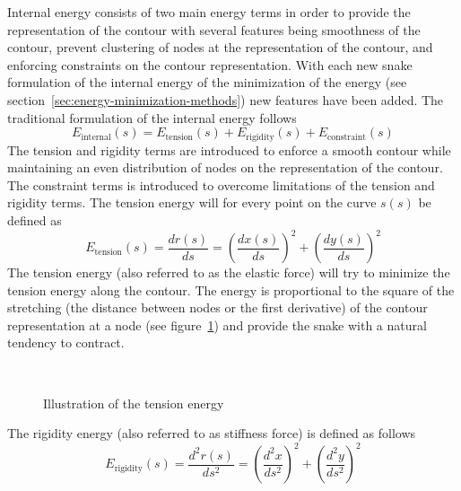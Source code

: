 Internal energy consists of two main energy terms in order to provide
the representation of the contour with several features being
smoothness of the contour, prevent clustering of nodes at the
representation of the contour, and enforcing constraints on the
contour representation. With each new snake formulation of the
internal energy of the minimization of the energy (see
section~\ref{sec:energy-minimization-methods}) new features have been
added. The traditional formulation of the internal energy follows
\begin{equation}
  \label{eq:snake-energy-internal}
  E_{\text{internal}}(s) = 
    E_{\text{tension}}(s) + 
    E_{\text{rigidity}}(s) +
    E_{\text{constraint}}(s)
\end{equation}
The tension and rigidity terms are introduced to enforce a smooth
contour while maintaining an even distribution of nodes on the
representation of the contour. The constraint terms is introduced to
overcome limitations of the tension and rigidity terms.  The tension
energy will for every point on the curve $s(s)$ be defined as
\begin{equation}
  \label{eq:energy-elastic}
  E_{\text{tension}}(s) = \frac{dr(s)}{ds} = \left(\frac{dx(s)}{ds}\right)^2+\left(\frac{dy(s)}{ds}\right)^2
\end{equation}
The tension energy (also referred to as the elastic force) will try to
minimize the tension energy along the contour. The energy is
proportional to the square of the stretching (the distance between
nodes or the first derivative) of the contour representation at a node (see
figure~\ref{fig:internal-energy-tension}) and provide the snake with a
natural tendency to contract.
\begin{figure}[htbp]
  \centering
  \mbox{%
    \quad%
    }
  \caption{Illustration of the tension energy}
  \label{fig:internal-energy-tension}
\end{figure}
The rigidity energy (also referred to as stiffness force) is defined
as follows
\begin{equation}
  \label{eq:internal-energy-rigidity}
  E_{\text{rigidity}}(s) 
    = \frac{d^2r(s)}{ds^2} 
    = \left(\frac{d^2x}{ds^2}\right)^2+\left(\frac{d^2y}{ds^2}\right)^2
\end{equation}
